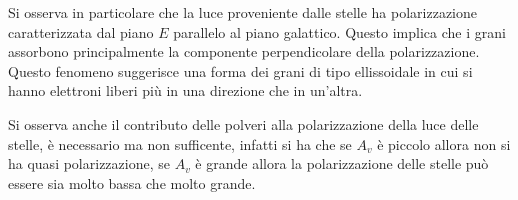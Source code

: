 Si osserva in particolare che la luce proveniente dalle stelle ha polarizzazione caratterizzata dal piano $E$ parallelo al piano galattico. Questo implica che i grani assorbono principalmente la componente perpendicolare della polarizzazione. Questo fenomeno suggerisce una forma dei grani di tipo ellissoidale in cui si hanno elettroni liberi pi\`u in una direzione che in un'altra.

Si osserva anche il contributo delle polveri alla polarizzazione della luce delle stelle, \`e necessario ma non sufficente, infatti si ha che se $A_v$ \`e piccolo allora non si ha quasi polarizzazione, se $A_v$ \`e grande allora la polarizzazione delle stelle pu\`o essere sia molto bassa che molto grande.


















